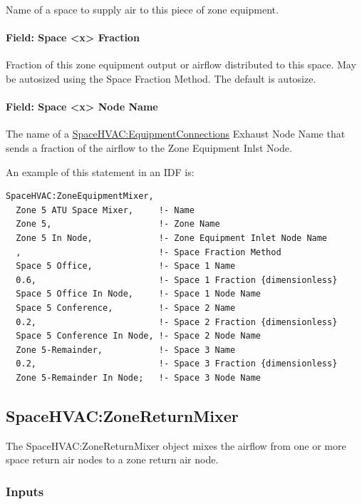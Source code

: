 Name of a space to supply air to this piece of zone equipment.

\paragraph{Field: Space \textless{}x\textgreater{} Fraction}\label{field-seqmixer-space-output-fraction}

Fraction of this zone equipment output or airflow distributed to this space. May be autosized using the Space Fraction Method. The default is autosize.

\paragraph{Field: Space \textless{}x\textgreater{} Node Name}\label{field-seqmixer-space-node-name}

The name of a \hyperref[spacehvacequipmentconnections]{SpaceHVAC:EquipmentConnections} Exhaust Node Name that sends a fraction of the airflow to the Zone Equipment Inlst Node.

An example of this statement in an IDF is:

\begin{lstlisting}
SpaceHVAC:ZoneEquipmentMixer,
  Zone 5 ATU Space Mixer,     !- Name
  Zone 5,                     !- Zone Name
  Zone 5 In Node,             !- Zone Equipment Inlet Node Name
  ,                           !- Space Fraction Method
  Space 5 Office,             !- Space 1 Name
  0.6,                        !- Space 1 Fraction {dimensionless}
  Space 5 Office In Node,     !- Space 1 Node Name
  Space 5 Conference,         !- Space 2 Name
  0.2,                        !- Space 2 Fraction {dimensionless}
  Space 5 Conference In Node, !- Space 2 Node Name
  Zone 5-Remainder,           !- Space 3 Name
  0.2,                        !- Space 3 Fraction {dimensionless}
  Zone 5-Remainder In Node;   !- Space 3 Node Name
\end{lstlisting}

\subsection{SpaceHVAC:ZoneReturnMixer}\label{spacehvaczonereturnmixer}

The SpaceHVAC:ZoneReturnMixer object mixes the airflow from one or more space return air nodes to a zone return air node.

\subsubsection{Inputs}\label{inputs-1-052-sretmixer}

